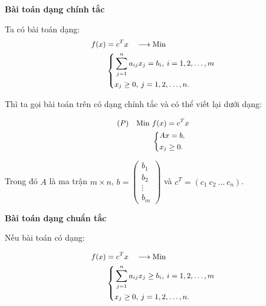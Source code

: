 \documentclass[12pt,a4paper]{report}
\begin{document}
     \textbf{Bài toán dạng chính tắc}
    
    Ta có bài toán dạng:
    \begin{equation} \small \label{F}
        \begin{split}
        f(x) & = c^Tx \quad \longrightarrow \text{Min} \\
            & \left\{
            \begin{split}
            & \sum _{j=1}^n a_{ij} x_j = b_i, \: i=1,2,\ldots,m \\
            & x_j \geq 0, \: j=1,2,\ldots,n.
            \end{split}
            \right.    
        \end{split}
    \end{equation}

    Thì ta gọi bài toán trên có dạng chính tắc và có thể viết lại dưới dạng:

    \begin{equation} \small \label{chinhtac}
        \begin{split}
        (P) \quad \text{Min } & f(x) = c^Tx \\
            & \left\{
            \begin{split}
            & Ax=b, \\
            & x_j \geq 0.
            \end{split}
            \right.    
        \end{split}
    \end{equation}

    Trong đó $A$ là ma trận $m\times n$, $b=\begin{pmatrix}
        b_1 \\
        b_2 \\
        \vdots \\
        b_m
        \end{pmatrix}$ và $c^T=(c_1 \: c_2 \: \ldots \: c_n)$.

     \textbf{Bài toán dạng chuẩn tắc}
    
    Nếu bài toán có dạng:

    \begin{equation} \small \label{F}
        \begin{split}
        f(x) & = c^Tx \quad \longrightarrow \text{Min} \\
            & \left\{
            \begin{split}
            & \sum _{j=1}^n a_{ij} x_j \geq b_i, \: i=1,2,\ldots,m \\
            & x_j \geq 0, \: j=1,2,\ldots,n.
            \end{split}
            \right.    
        \end{split}
    \end{equation}
\end{document}
